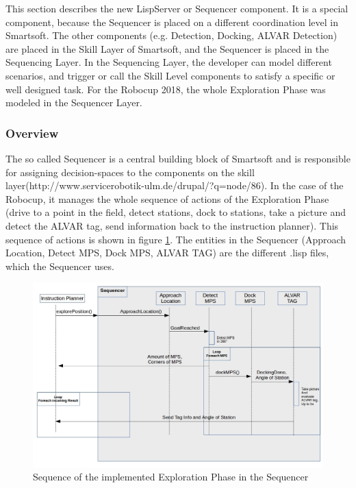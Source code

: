 This section describes the new LispServer or Sequencer component. It is a special component, because the Sequencer is placed on a different coordination level in Smartsoft. The other components (e.g. Detection, Docking, ALVAR Detection) are placed in the Skill Layer of Smartsoft, and the Sequencer is placed in the Sequencing Layer. In the Sequencing Layer, the developer can model different scenarios, and trigger or call the Skill Level components to satisfy a specific or well designed task. 
For the Robocup 2018, the whole Exploration Phase was modeled in the Sequencer Layer.

\subsubsection{Overview}
\label{sec:sequencer_overview}
The so called Sequencer is a central building block of Smartsoft and is responsible for assigning decision-spaces to the components on the skill layer(http://www.servicerobotik-ulm.de/drupal/?q=node/86). In the case of the Robocup, it manages the whole sequence of actions of the Exploration Phase (drive to a point in the field, detect stations, dock to stations, take a picture and detect the ALVAR tag, send information back to the instruction planner). This sequence of actions is shown in figure \ref{fig:sequ_overview}.
The entities in the Sequencer (Approach Location, Detect MPS, Dock MPS, ALVAR TAG) are the different .lisp files, which the Sequencer uses.

\begin{figure}[h]
\centering
\includegraphics[scale=0.5]{pic/sequenceSequencer.jpg}
\caption{Sequence of the implemented Exploration Phase in the Sequencer}
\label{fig:sequ_overview}
\end{figure}


